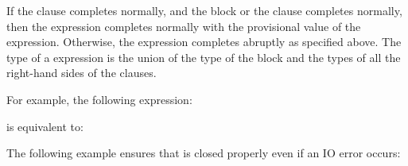 If the  clause completes normally,
and the  block or the 
clause completes normally, then the  expression completes
normally with the provisional value of the  expression.
Otherwise, the  expression completes abruptly as specified above.
The type of a  expression is the union
of the type of the  block
and the types of all the right-hand sides of the  clauses.

For example, the following  expression:

is equivalent to:

The following example ensures that  is closed properly even if an
IO error occurs:

